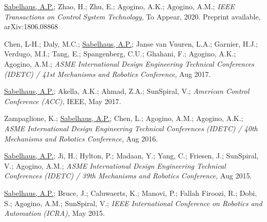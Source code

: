 \documentclass[letterpaper]{deedy-resume} %
\begin{document}
{%

\begin{etaremune}

\item {} \underline{Sabelhaus, A.P.}; Zhao, H.; Zhu, E.; Agogino, A.K.; Agogino, A.M.; {\it IEEE Transactions on Control System Technology}, To Appear, 2020. Preprint available, arXiv:1806.08868

\item {} Chen, L-H.;  Daly, M.C.; \underline{Sabelhaus, A.P.}; Janse van Vuuren, L.A.; Garnier, H.J.; Verdugo, M.I.; Tang, E.; Spangenberg, C.U.; Ghahani, F.; Agogino, A.K.; Agogino, A.M.; {\it ASME International Design Engineering Technical Conferences (IDETC) / 41st Mechanisms and Robotics Conference}, Aug 2017.

\item {} \underline{Sabelhaus, A.P.}; Akella, A.K.; Ahmad, Z.A.; SunSpiral, V.; {\it American Control Conference (ACC),} IEEE, May 2017.
  
\item {} Zampaglione, K.; \underline{Sabelhaus, A.P.};  Chen, L.;  Agogino, A.M.;  Agogino, A.K.;  {\it ASME International Design Engineering Technical Conferences (IDETC) / 40th Mechanisms and Robotics Conference,} Aug 2016.
  
\item {} \underline{Sabelhaus, A.P.}; Ji, H.; Hylton, P.; Madaan, Y.; Yang, C.; Friesen, J.; SunSpiral, V.; Agogino, A.M.; {\it ASME International Design Engineering Technical Conferences (IDETC) / 39th Mechanisms and Robotics Conference,} Aug 2015.

\item {} \underline{Sabelhaus, A.P.}; Bruce, J.; Caluwaerts, K.; Manovi, P.; Fallah Firoozi, R.; Dobi, S.; Agogino, A.M.; SunSpiral, V.; {\it IEEE International Conference on Robotics and Automation (ICRA),} May 2015.


\end{etaremune}}
\end{document}
